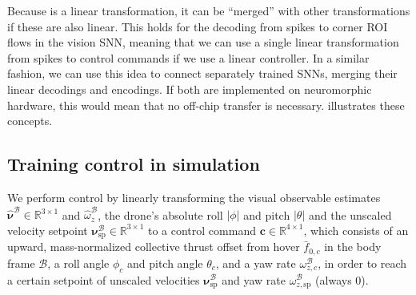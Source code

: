 Because  is a linear transformation, it can be ``merged'' with other transformations if these are also linear. This holds for the decoding from spikes to corner ROI flows in the vision SNN, meaning that we can use a single linear transformation from spikes to control commands if we use a linear controller. In a similar fashion, we can use this idea to connect separately trained SNNs, merging their linear decodings and encodings. If both are implemented on neuromorphic hardware, this would mean that no off-chip transfer is necessary.  illustrates these concepts.

\subsection*{Training control in simulation}

We perform control by linearly transforming the visual observable estimates $\boldsymbol{\hat\nu}^\mathcal{B} \in \mathbb{R}^{3\times 1}$ and $\hat\omega_z^\mathcal{B}$, the drone's absolute roll $\lvert\phi\rvert$ and pitch $\lvert\theta\rvert$ and the unscaled velocity setpoint $\boldsymbol{\nu}^\mathcal{B}_{\mathrm{sp}} \in \mathbb{R}^{3\times1}$ to a control command $\boldsymbol{c} \in \mathbb{R}^{4\times 1}$, which consists of an upward, mass-normalized collective thrust offset from hover $\bar{f}_{0,c}$ in the body frame $\mathcal{B}$, a roll angle $\phi_c$ and pitch angle $\theta_c$, and a yaw rate $\omega^\mathcal{B}_{z,c}$, in order to reach a certain setpoint of unscaled velocities $\boldsymbol{\nu}_{\mathrm{sp}}^\mathcal{B}$ and yaw rate $\omega_{z,\mathrm{sp}}^\mathcal{B}$ (always 0).

